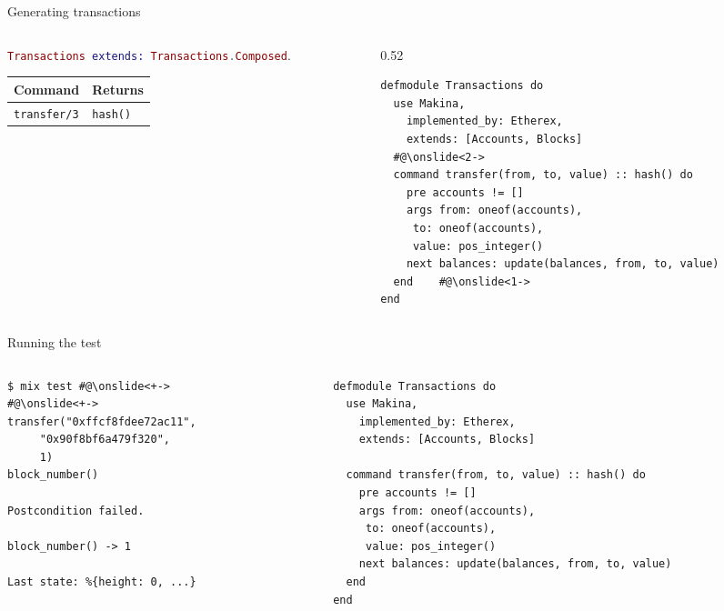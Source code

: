 \documentclass[aspectratio=169, 10pt]{beamer}
\begin{document}
\begin{frame}[label={sec:orgdfae3e2},fragile]{Generating transactions}
 \begin{columns}
\begin{column}{0.44\columnwidth}
\onslide<+->
\lstinline[language=elixir, style=display]~Transactions extends: Transactions.Composed~.
\vspace{10pt}

\onslide<+->
\begin{center}
\begin{tabular}{ll}
Command & Returns\\
\hline
\texttt{transfer/3} & \texttt{hash()}\\
\end{tabular}
\end{center}
\end{column}
\begin{column}{0.52\columnwidth}
\lstset{language=elixir,label= ,caption= ,captionpos=b,numbers=none,style=display}
\begin{lstlisting}
defmodule Transactions do
  use Makina,
    implemented_by: Etherex,
    extends: [Accounts, Blocks]
  #@\onslide<2->
  command transfer(from, to, value) :: hash() do
    pre accounts != []
    args from: oneof(accounts),
	 to: oneof(accounts),
	 value: pos_integer()
    next balances: update(balances, from, to, value)
  end    #@\onslide<1->
end
\end{lstlisting}
\end{column}
\end{columns}
\end{frame}

\begin{frame}[label={sec:orgab33a51},fragile]{Running the test}
 \begin{columns}
\begin{column}{0.44\columnwidth}
\lstset{language=bash,label= ,caption= ,captionpos=b,numbers=none,style=shell}
\begin{lstlisting}
$ mix test #@\onslide<+->
#@\onslide<+->
transfer("0xffcf8fdee72ac11",
	 "0x90f8bf6a479f320",
	 1)
block_number()

Postcondition failed.

block_number() -> 1

Last state: %{height: 0, ...}
\end{lstlisting}
\end{column}

\begin{column}{0.52\columnwidth}
\lstset{language=elixir,label= ,caption= ,captionpos=b,numbers=none,style=display}
\begin{lstlisting}
defmodule Transactions do
  use Makina,
    implemented_by: Etherex,
    extends: [Accounts, Blocks]

  command transfer(from, to, value) :: hash() do
    pre accounts != []
    args from: oneof(accounts),
	 to: oneof(accounts),
	 value: pos_integer()
    next balances: update(balances, from, to, value)
  end
end
\end{lstlisting}
\end{column}
\end{columns}
\end{frame}
\end{document}
